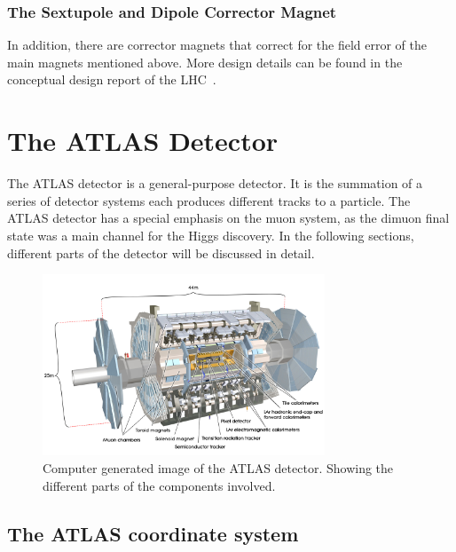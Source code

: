\subsubsection*{The Sextupole and Dipole Corrector Magnet}
In addition, there are corrector magnets that correct for the field error of the main magnets mentioned above. More design details can be found in the conceptual design report of the LHC~\cite{Bruning:782076}.

\section{The ATLAS Detector}
\label{ATLAS}
The ATLAS detector is a general-purpose detector. It is the summation of a series of detector systems each produces different tracks to a particle. The ATLAS detector has a special emphasis on the muon system, as the dimuon final state was a main channel for the Higgs discovery. In the following sections, different parts of the detector will be discussed in detail. 

\begin{figure}[!htb]
    \begin{center}
        \includegraphics[width=0.75\textwidth]{figures/chapter_ATLAS/ATLASDetector}
        \caption{
			Computer generated image of the ATLAS detector\cite{Pequenao:1095924}. Showing the different parts of the components involved. 
        }
        \label{fig:ATLASDectector}
    \end{center}
\end{figure}


\subsection*{The ATLAS coordinate system}

